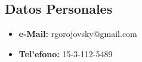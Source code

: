 
 

\subsection*{Datos Personales}
\begin{itemize}
\item \textbf{e-Mail:} rgorojovsky@gmail.com 
\item \textbf{Tel'efono:} 15-3-112-5489
\end{itemize}


